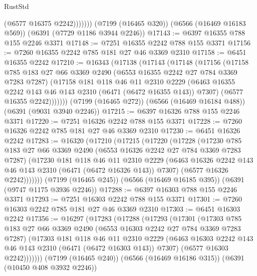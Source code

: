 \begin{lexlean}{RustStd}
\begin{coremodule}
{\begin{coremodule}
{{{{{{{{{{{{{{{{{{{{{{{{{{                (@6577 @16375 @2242)))))))
    (@7199 (@16465 @320))
    (@6566 (@16469 @16183 @569))
    (@6391 (@7729 @1186 @3944 @2246))
@17143 := @6397 @16355 @788 @155 @2246 @3371
@17148 := @7251 @16355 @2242 @788 @155 @3371
@17156 := @7260 @16355 @2242 @785 @181 @27 @46 @3369 @2310
@17158 := @6451 @16355 @2242
@17210 := @16343
    (@17138
      (@17143
        (@17148
          (@17156
            (@17158
              @785
              @183
              @27
              @66
              @3369
              @2490
              (@6553 @16355 @2242 @27 @784 @3369 @7283 @7287)
              (@17158
                @181
                @118
                @46
                @11
                @2310
                @2229
                (@6463 @16355 @2242 @143 @46 @143 @2310 (@6471 (@6472 @16355 @143)) @7307)
                (@6577 @16355 @2242)))))))
    (@7199 (@16465 @272))
    (@6566 (@16469 @16184 @488))
    (@6391 (@9031 @3940 @2246))
@17215 := @6397 @16326 @788 @155 @2246 @3371
@17220 := @7251 @16326 @2242 @788 @155 @3371
@17228 := @7260 @16326 @2242 @785 @181 @27 @46 @3369 @2310
@17230 := @6451 @16326 @2242
@17283 := @16320
    (@17210
      (@17215
        (@17220
          (@17228
            (@17230
              @785
              @183
              @27
              @66
              @3369
              @2490
              (@6553 @16326 @2242 @27 @784 @3369 @7283 @7287)
              (@17230
                @181
                @118
                @46
                @11
                @2310
                @2229
                (@6463 @16326 @2242 @143 @46 @143 @2310 (@6471 (@6472 @16326 @143)) @7307)
                (@6577 @16326 @2242)))))))
    (@7199 (@16465 @245))
    (@6566 (@16469 @16185 @395))
    (@6391 (@9747 @1175 @3936 @2246))
@17288 := @6397 @16303 @788 @155 @2246 @3371
@17293 := @7251 @16303 @2242 @788 @155 @3371
@17301 := @7260 @16303 @2242 @785 @181 @27 @46 @3369 @2310
@17303 := @6451 @16303 @2242
@17356 := @16297
    (@17283
      (@17288
        (@17293
          (@17301
            (@17303
              @785
              @183
              @27
              @66
              @3369
              @2490
              (@6553 @16303 @2242 @27 @784 @3369 @7283 @7287)
              (@17303
                @181
                @118
                @46
                @11
                @2310
                @2229
                (@6463 @16303 @2242 @143 @46 @143 @2310 (@6471 (@6472 @16303 @143)) @7307)
                (@6577 @16303 @2242)))))))
    (@7199 (@16465 @240))
    (@6566 (@16469 @16186 @315))
    (@6391 (@10450 @408 @3932 @2246))
}}}}}}}}}}}}}}}}}}}}}}}}}}
\end{coremodule}}
\end{coremodule}
\end{lexlean}
